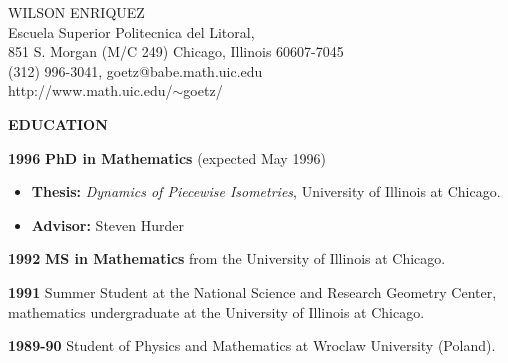 \voffset=-1.2in
\hoffset=-0.9in
\setlength{\textheight}{10.750in}
\setlength{\textwidth}{7.1in}
\baselineskip=1in

\begin{center}
 {\Large    WILSON ENRIQUEZ}
\\
{\scriptsize Escuela Superior Politecnica del Litoral,\\
851 S. Morgan (M/C 249) Chicago, Illinois 60607-7045\\
(312) 996-3041, goetz@babe.math.uic.edu\\  http://www.math.uic.edu/$\sim$goetz/\\}
\end{center}


 
\hspace{-.29in}
 {\bf  EDUCATION }
\vspace{-.09in}
 \begin{list}{name}{ 18em \leftmargin .93in \itemsep -.025in }

\item [\bf 1996] {\bf PhD in  Mathematics} (expected May 1996)
\begin{itemize}
\vspace{-.04in}
\item  {\bf  Thesis:} {\em Dynamics of Piecewise Isometries}, University of Illinois at Chicago. 
\hspace{-.29in}
\vspace{-.04in}
 \item {\bf  Advisor:} Steven Hurder


\end{itemize} 
 \item [\bf 1992] {\bf MS in  Mathematics} from the University of Illinois at Chicago. 
 \item  [\bf 1991]  Summer Student at the National Science  and   
                     Research Geometry Center, \vspace{-.032in} \\  mathematics undergraduate at the University of Illinois at Chicago. 
\item   [\bf 1989-90]  Student  of  Physics and Mathematics at  Wroclaw University (Poland).
\end{list}
\vspace {.16in}


